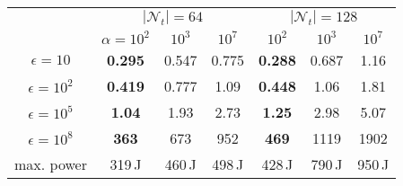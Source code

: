 \documentclass[conference,10pt]{IEEEtran}
\theoremstyle{definition}
\theoremstyle{definition}
\renewcommand{\baselinestretch}{0.85}
\begin{document}
\begin{table}[t]
\begin{tabular}{ccccccc}
		                  & \multicolumn{3}{c}{$|\mathcal{N}_t| = 64$} & \multicolumn{3}{c}{$|\mathcal{N}_t| = 128$}                                             \\
		                  & $\alpha = 10^2$                            & $10^3$                                      & $10^7$ & $10^2$         & $10^3$ & $10^7$ \\\cmidrule(r){1-1}\cmidrule(r){2-4}\cmidrule(r){5-7}
		$\epsilon = 10$   & \textbf{0.295}                             & 0.547                                       & 0.775  & \textbf{0.288} & 0.687  & 1.16   \\
		$\epsilon = 10^2$ & \textbf{0.419}                             & 0.777                                       & 1.09   & \textbf{0.448} & 1.06   & 1.81   \\
		$\epsilon = 10^5$ & \textbf{1.04}                              & 1.93                                        & 2.73   & \textbf{1.25}  & 2.98   & 5.07   \\
		$\epsilon = 10^8$ & \textbf{363}                               & 673                                         & 952    & \textbf{469}   & 1119   & 1902   \\
		\cmidrule(r){1-1}\cmidrule(r){2-4}\cmidrule(r){5-7}
		max. power        & 319\,J                                     & 460\,J                                      & 498\,J & 428\,J         & 790\,J & 950\,J \\\bottomrule
	\end{tabular}
	\vspace{-2.3em}
\end{table}
\endgroup

\begingroup
\renewcommand{\baselinestretch}{0.88}
\tiny


\endgroup
\end{document}
